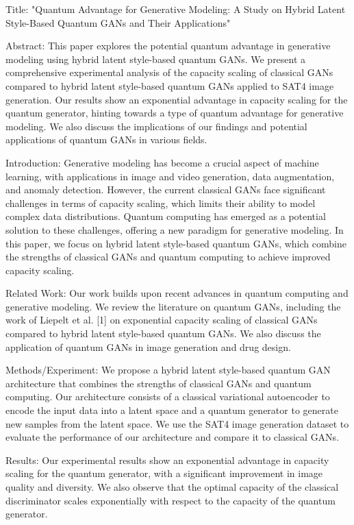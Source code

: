 Title: "Quantum Advantage for Generative Modeling: A Study on Hybrid Latent Style-Based Quantum GANs and Their Applications"

Abstract: This paper explores the potential quantum advantage in generative modeling using hybrid latent style-based quantum GANs. We present a comprehensive experimental analysis of the capacity scaling of classical GANs compared to hybrid latent style-based quantum GANs applied to SAT4 image generation. Our results show an exponential advantage in capacity scaling for the quantum generator, hinting towards a type of quantum advantage for generative modeling. We also discuss the implications of our findings and potential applications of quantum GANs in various fields.


Introduction:
Generative modeling has become a crucial aspect of machine learning, with applications in image and video generation, data augmentation, and anomaly detection. However, the current classical GANs face significant challenges in terms of capacity scaling, which limits their ability to model complex data distributions. Quantum computing has emerged as a potential solution to these challenges, offering a new paradigm for generative modeling. In this paper, we focus on hybrid latent style-based quantum GANs, which combine the strengths of classical GANs and quantum computing to achieve improved capacity scaling.


Related Work:
Our work builds upon recent advances in quantum computing and generative modeling. We review the literature on quantum GANs, including the work of Liepelt et al. [1] on exponential capacity scaling of classical GANs compared to hybrid latent style-based quantum GANs. We also discuss the application of quantum GANs in image generation and drug design.


Methods/Experiment:
We propose a hybrid latent style-based quantum GAN architecture that combines the strengths of classical GANs and quantum computing. Our architecture consists of a classical variational autoencoder to encode the input data into a latent space and a quantum generator to generate new samples from the latent space. We use the SAT4 image generation dataset to evaluate the performance of our architecture and compare it to classical GANs.


Results:
Our experimental results show an exponential advantage in capacity scaling for the quantum generator, with a significant improvement in image quality and diversity. We also observe that the optimal capacity of the classical discriminator scales exponentially with respect to the capacity of the quantum generator.


